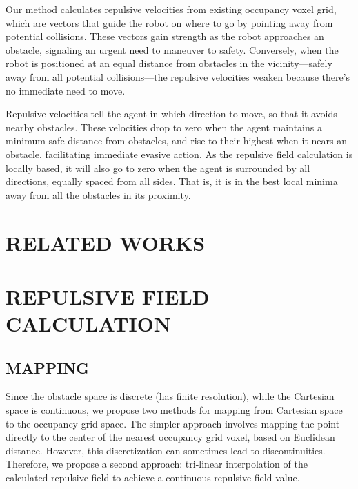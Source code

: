 \documentclass[letterpaper, 10 pt, conference]{ieeeconf}  %
\begin{document}
Our method calculates repulsive velocities from existing occupancy voxel grid, which are vectors that guide the robot on where to go by pointing away from potential collisions. These vectors gain strength as the robot approaches an obstacle, signaling an urgent need to maneuver to safety. Conversely, when the robot is positioned at an equal distance from obstacles in the vicinity—safely away from all potential collisions—the repulsive velocities weaken because there’s no immediate need to move. 



Repulsive velocities tell the agent in which direction to move, so that it avoids nearby obstacles. These velocities drop to zero when the agent maintains a minimum safe distance from obstacles, and rise to their highest when it nears an obstacle, facilitating immediate evasive action. As the repulsive field calculation is locally based, it will also go to zero when the agent is surrounded by all directions, equally spaced from all sides. That is, it is in the best local minima away from all the obstacles in its proximity. 


\section{RELATED WORKS}


\section{REPULSIVE FIELD CALCULATION}

\subsection{MAPPING}

Since the obstacle space is discrete (has finite resolution), while the Cartesian space is continuous, we propose two methods for mapping from Cartesian space to the occupancy grid space. The simpler approach involves mapping the point directly to the center of the nearest occupancy grid voxel, based on Euclidean distance. However, this discretization can sometimes lead to discontinuities. Therefore, we propose a second approach: tri-linear interpolation of the calculated repulsive field to achieve a continuous repulsive field value.
\end{document}
